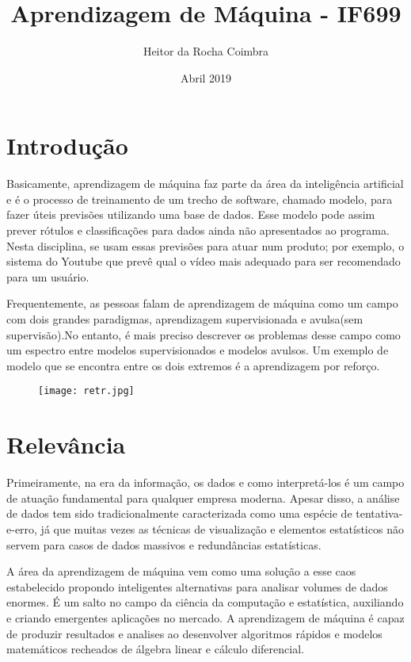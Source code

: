 \documentclass[10pt]{article}
\title{Aprendizagem de Máquina - IF699}
\author{Heitor da Rocha Coimbra}
\date{Abril 2019}
\begin{document}
\maketitle

\section{Introdução}
Basicamente, aprendizagem de máquina faz parte da área da inteligência artificial e é o processo de treinamento de um trecho de software, chamado modelo, para fazer úteis previsões utilizando uma base de dados. Esse modelo pode assim prever rótulos e classificações para dados ainda não apresentados ao programa. Nesta disciplina, se usam essas previsões para atuar num produto; por exemplo, o sistema do Youtube que prevê qual o vídeo mais adequado para ser recomendado para um usuário.\newline


Frequentemente, as pessoas falam de aprendizagem de máquina como um campo com dois grandes paradigmas, aprendizagem supervisionada e avulsa(sem supervisão).No entanto, é mais preciso descrever os problemas desse campo como um espectro entre modelos supervisionados e modelos avulsos. Um exemplo de modelo que se encontra entre os dois extremos é a aprendizagem por reforço.\newline

\cite{alpaydin2015learning} 

\begin{figure}[ht]
\centering
\texttt{[image: retr.jpg]}
\caption{ \cite{photo2012learning}}
\label{fig:my_label}
\end{figure}

\section{Relevância}
Primeiramente, na era da informação, os dados e como interpretá-los é um campo de atuação fundamental para qualquer empresa moderna. Apesar disso, a análise de dados tem sido tradicionalmente caracterizada como uma espécie de tentativa-e-erro, já que muitas vezes as técnicas de visualização e elementos estatísticos não servem para casos de dados massivos e redundâncias estatísticas.\newline


A área da aprendizagem de máquina vem como uma solução a esse caos estabelecido propondo inteligentes alternativas para analisar volumes de dados enormes. É um salto no campo da ciência da computação e estatística, auxiliando e criando emergentes aplicações no mercado. A aprendizagem de máquina é capaz de produzir resultados e analises ao desenvolver algoritmos rápidos e modelos matemáticos recheados de álgebra linear e cálculo diferencial.
\cite{tom1997learning}
\end{document}
